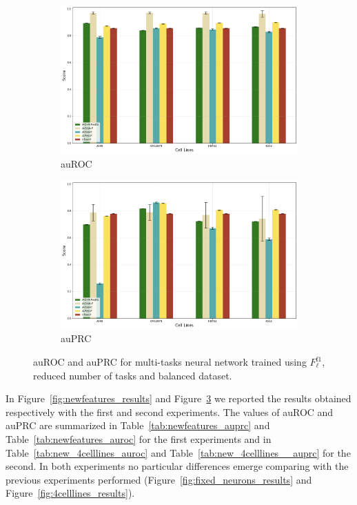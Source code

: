 \begin{figure}[!htbp]
    \centering
    \begin{subfigure}[b]{\textwidth}
        \includegraphics[width=\textwidth]{images/results_plots/4celllines_new_auroc.png}
        \caption{auROC}
        \label{fig:auroc_new_4celllines}
    \end{subfigure}
    \begin{subfigure}[b]{\textwidth}
        \includegraphics[width=\textwidth]{images/results_plots/4celllines_new_auprc.png}
        \caption{auPRC}
        \label{fig:auprc_new_4celllines}
    \end{subfigure}
   \caption{auROC and auPRC for multi-tasks neural network trained using $F_\ell^{\textrm{f1}}$, reduced number of tasks and balanced dataset.}\label{fig:new_4celllines_results}
\end{figure}

In Figure~\ref{fig:newfeatures_results} and Figure~\ref{fig:new_4celllines_results} we reported the results obtained respectively with the first and second experiments. The values of auROC and auPRC are summarized in Table~\ref{tab:newfeatures_auprc} and Table~\ref{tab:newfeatures_auroc} for the first experiments and in Table~\ref{tab:new_4celllines_auroc} and Table~\ref{tab:new_4celllines__auprc} for the second. 
In both experiments no particular differences emerge comparing with the previous experiments performed (Figure~\ref{fig:fixed_neurons_results} and Figure~\ref{fig:4celllines_results}).


